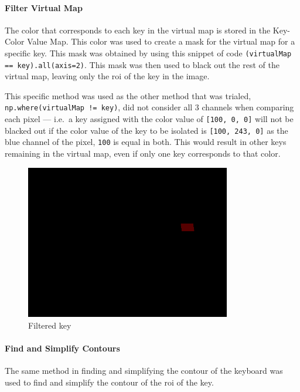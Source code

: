 \documentclass{report}
\begin{document}
\paragraph{Filter Virtual Map}
The color that corresponds to each key in the virtual map is stored in the
Key-Color Value Map. This color was used to create a mask for the virtual map
for a specific key. This mask was obtained by using this snippet of code
\texttt{(virtualMap == key).all(axis=2)}. This mask was then used to black out
the rest of the virtual map, leaving only the \ac{roi} of the key in the image.

This specific method was used as the other method that was trialed,
\texttt{np.where(virtualMap != key)}, did not consider all 3 channels when
comparing each pixel --- i.e.\ a key assigned with the color value of
\texttt{[100, 0, 0]} will not be blacked out if the color value of the key to be
isolated is \texttt{[100, 243, 0]} as the blue channel of the pixel,
\texttt{100} is equal in both. This would result in other keys remaining in the
virtual map, even if only one key corresponds to that color.

\begin{figure}[H]
	\centering
	\includegraphics[width=0.8\textwidth]{filtered-key.png}
	\caption{Filtered key}
	\centering
\end{figure}

\paragraph{Find and Simplify Contours}
The same method in finding and simplifying the contour of the keyboard was used
to find and simplify the contour of the \ac{roi} of the key.
\end{document}
